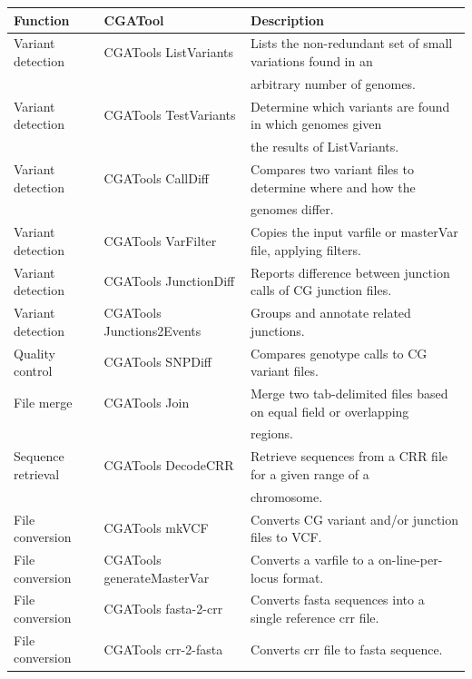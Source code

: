 \begin{table}[t!]
\small
\begin{tabular}{l|l|l}
\textbf{Function} & \textbf{CGATool}  & \textbf{Description} \\ \hline
Variant detection & CGATools ListVariants & Lists the non-redundant set of small variations found in an \\
                  &                       & arbitrary number of genomes.\\
Variant detection & CGATools TestVariants & Determine which variants are found in which genomes given \\
                  &                       & the results of ListVariants.\\
Variant detection & CGATools CallDiff     & Compares two variant files to determine where and how the \\
                  &                       & genomes differ.\\
Variant detection & CGATools VarFilter    & Copies the input varfile or masterVar file, applying filters.\\
Variant detection & CGATools JunctionDiff & Reports difference between junction calls of CG junction files.\\
Variant detection & CGATools Junctions2Events & Groups and annotate related junctions.\\
Quality control   & CGATools SNPDiff      & Compares genotype calls to CG variant files.\\
File merge        & CGATools Join         & Merge two tab-delimited files based on equal field or overlapping \\
                  &                       & regions.\\
Sequence retrieval& CGATools DecodeCRR    & Retrieve sequences from a CRR file for a given range of a \\
                  &                       & chromosome.\\
File conversion   & CGATools mkVCF        & Converts CG variant and/or junction files to VCF.\\
File conversion   & CGATools generateMasterVar & Converts a varfile to a on-line-per-locus format.\\
File conversion   & CGATools fasta-2-crr  & Converts fasta sequences into a single reference crr file.\\
File conversion   & CGATools crr-2-fasta  & Converts crr file to fasta sequence.\\

\end{tabular}
\end{table}
